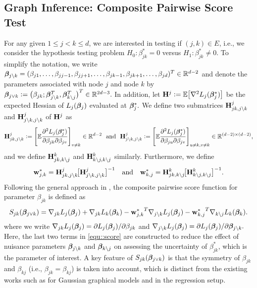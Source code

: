 \documentclass[twoside,11pt]{article}
\newcommand{\defeq}{\vcentcolon=}
\newcommand*{\BR}{\mathbb{R}}
\newcommand*{\sw}{\wb^*}
\begin{document}
\subsection{Graph Inference: Composite Pairwise Score Test}
For any given $1 \leq j < k\leq d$, we are interested in testing if $(j,k) \in E$, i.e., 
we consider the hypothesis testing problem $H_0: \beta_{jk}^* = 0$ versus $H_1: \beta_{jk}^* \neq 0$.
To simplify the notation, we write 
$
\bbeta_{j\setminus k} =  (\beta_{j1},\ldots, \beta_{jj-1},\beta_{jj+1},\ldots, \beta_{jk-1}, \beta_{jk+1},\ldots,\beta_{jd})^T \in\BR^{d-2}$ and 
denote the parameters associated with node $j$ and node $k$ by  $\bbeta_{j\vee k} \defeq \bigl( \beta_{jk};  \bbeta_{j\setminus k}^T,\bbeta_{k\setminus j}^T \bigr)^T\in \BR^{2d-3} .$ In addition, let  $\Hb^j \defeq \EE\bigl[  \nabla^2 {L_j} (\bbeta_j^*) \bigr]$ be the expected   Hessian of ${L_j}(\bm{\beta}_j)$ evaluated at   $\bm{\beta}_j^*.$ We define two submatrices $\mathbf{H}_{jk, j \setminus k}^{j}$ and  $\mathbf{H}_{j\setminus k,j \setminus k}^{j}$ of $\mathbf{H}^{j}$  as 
 $$
\Hb_{ jk,j \setminus k}^{j} \defeq \Biggl[ \EE \frac{\partial ^2 L_j(\bbeta_j^*)} {\partial \beta_{jk} \partial \beta_{jv}} \Biggr]_{v\neq k} \in\RR^{d-2} ~~\text{and} ~~\Hb_{j\setminus k,j \setminus k}^{j} \defeq \Biggl[ \EE \frac{ \partial ^2 L_j(\bbeta_j^*)} {\partial \beta_{ju} \partial \beta_{jv} }\Biggr]_{u \neq k ,v \neq k}\in\RR^{(d-2)\times (d-2)}, 
 $$
and  we define $\mathbf{H}_{jk,k\setminus j}^k  $ and $\mathbf{H}_{k\setminus j,k\setminus j}^k $ similarly.
Furthermore, we define  
\begin{align}\label{eq:sw_vec}
 {\sw_{j,k}}  =  \Hb_{jk, j\setminus k}^{j} \!\bigl[\Hb_{j\setminus k,j\setminus k}^{j}\bigr]^{-1} \quad  \text{and} \quad {\sw_{k, j}}  =  \Hb_{jk, k\setminus j}^k \!\bigl[\Hb_{k\setminus j,k \setminus j}^{k}\bigr]^{-1} .
 \end{align} 
Following the general approach in \cite{ning2017general,neykov2018unified}, the composite pairwise score function for parameter $\beta_{jk}$ is defined as 
\begin{align}\label{equ::score}
S_{jk}(\bbeta_{j \vee k} ) = \nabla_{jk}  L_{j} (\bbeta_j) + \nabla_{jk}L_k(\bbeta_k) - {\sw_{j,k}} ^T \nabla_{j\setminus k} L_{j}(\bbeta_j) - {\sw_{k, j}} ^T \nabla_{k\setminus j} L_k (\bbeta_k).
\end{align}
where we write  $\nabla_{jk}  L_{j} (\bm{\beta}_j) = \partial L_{j}(\bm{\beta}_j) /\partial \beta_{jk}$ and $\nabla_{j\setminus k}  L_{j} (\bm{\beta}_j) = \partial L_{j}(\bm{\beta}_j)/ \partial \bm{\beta}_{j\setminus k}.$ Here, the last two terms in \eqref{equ::score} are constructed to reduce the effect of nuisance parameters $\bm{\beta}_{j\setminus k}$ and $\bm{\beta}_{k\setminus j}$ on assessing the uncertainty of  $\beta_{jk}^*$, which is the parameter of interest. A key feature of $S_{jk}(\bm{\beta}_{j \vee k} )$ is that the symmetry of $\beta_{jk}$ and $\beta_{kj}$ (i.e., $\beta_{jk}=\beta_{kj}$) is taken into account, which is distinct from the existing works  such as  \cite{ren2013asymptotic,jankova2014confidence,liu2013gaussian} for Gaussian graphical models and  \cite{ning2014sparc} in the regression setup.
\end{document}
